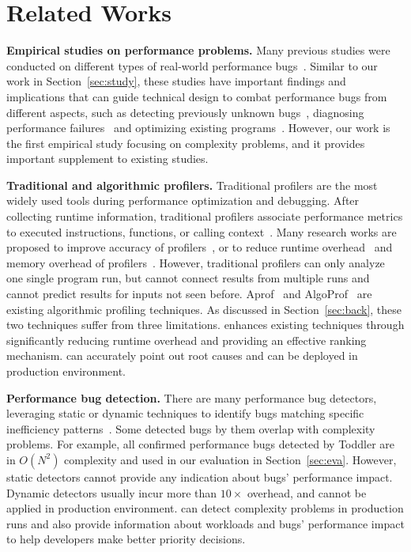 
\section{Related Works}
\label{sec:related}

\noindent\textbf{Empirical studies on performance problems.}
Many previous studies were conducted on different types 
of real-world performance
bugs~\cite{PerfBug,SongOOPSLA2014,ldoctor,Zaman2012MSR,Nistor2013MSR,HuangRegression,SmartphoneStudy,junwen-1}.
Similar to our work in Section~\ref{sec:study},
these studies have important findings and 
implications 
that can guide technical design to combat
performance bugs from different aspects, 
such as detecting previously unknown bugs~\cite{PerfBug,SmartphoneStudy,junwen-1}, 
diagnosing performance failures~\cite{SongOOPSLA2014,ldoctor} 
and optimizing existing programs~\cite{junwen-2}. 
However, our work is the first empirical study focusing 
on complexity problems,
and it provides important supplement to existing studies.

\noindent\textbf{Traditional and algorithmic profilers.}
Traditional profilers are the most widely used tools
during performance optimization and debugging.
After collecting runtime information,
traditional profilers associate performance metrics to executed instructions,
functions, or calling context~\cite{oprofile,gprof,CCT}.
Many research works are proposed to improve
accuracy of profilers~\cite{4Profilers, LagHunter, AppInsight}, or
to reduce runtime overhead~\cite{AdaptiveBurst}
and memory overhead of profilers~\cite{HotCallingContext}.
However, traditional profilers can only analyze one single program run,
but cannot connect results from multiple runs and cannot
predict results for inputs not seen before.
Aprof~\cite{Aprof1, Aprof2} and AlgoProf~\cite{AlgoProf} are existing
algorithmic profiling techniques.
As discussed in Section~\ref{sec:back},
these two techniques suffer from three limitations. 
\Tool enhances existing techniques through significantly 
reducing runtime overhead and providing an effective ranking mechanism. 
\Tool can accurately point out root causes 
and can be deployed in production environment. 


\noindent\textbf{Performance bug detection.}
There are many performance bug detectors, 
leveraging static or dynamic techniques to
identify bugs matching specific inefficiency
patterns~\cite{yufei-perf,CLARITY,xiao13:context,PerfBug,Alabama,CARAMEL,XuDataStructure,XuBloatPLDI2009,XuBloatPLDI2010,Cachetor,LoopInvariant,falsesharing}.
Some detected bugs by them overlap with complexity problems.
For example, 
all confirmed performance bugs detected by Toddler are 
in $O(N^2)$ complexity and used in our evaluation in Section~\ref{sec:eva}.
However, static detectors cannot provide any indication
about bugs' performance impact.
Dynamic detectors usually incur more than $10\times$ overhead,
and cannot be applied in production environment.
\Tool can detect complexity problems in production runs 
and also provide information about workloads and bugs' performance impact 
to help developers make better priority decisions. 